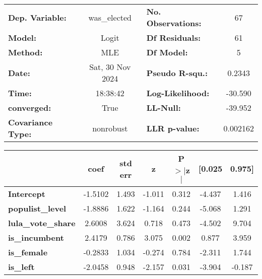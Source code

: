 \begin{center}
\begin{tabular}{lclc}
\toprule
\textbf{Dep. Variable:}    &   was\_elected   & \textbf{  No. Observations:  } &       67    \\
\textbf{Model:}            &      Logit       & \textbf{  Df Residuals:      } &       61    \\
\textbf{Method:}           &       MLE        & \textbf{  Df Model:          } &        5    \\
\textbf{Date:}             & Sat, 30 Nov 2024 & \textbf{  Pseudo R-squ.:     } &   0.2343    \\
\textbf{Time:}             &     18:38:42     & \textbf{  Log-Likelihood:    } &   -30.590   \\
\textbf{converged:}        &       True       & \textbf{  LL-Null:           } &   -39.952   \\
\textbf{Covariance Type:}  &    nonrobust     & \textbf{  LLR p-value:       } &  0.002162   \\
\bottomrule
\end{tabular}
\begin{tabular}{lcccccc}
                           & \textbf{coef} & \textbf{std err} & \textbf{z} & \textbf{P$> |$z$|$} & \textbf{[0.025} & \textbf{0.975]}  \\
\midrule
\textbf{Intercept}         &      -1.5102  &        1.493     &    -1.011  &         0.312        &       -4.437    &        1.416     \\
\textbf{populist\_level}   &      -1.8886  &        1.622     &    -1.164  &         0.244        &       -5.068    &        1.291     \\
\textbf{lula\_vote\_share} &       2.6008  &        3.624     &     0.718  &         0.473        &       -4.502    &        9.704     \\
\textbf{is\_incumbent}     &       2.4179  &        0.786     &     3.075  &         0.002        &        0.877    &        3.959     \\
\textbf{is\_female}        &      -0.2833  &        1.034     &    -0.274  &         0.784        &       -2.311    &        1.744     \\
\textbf{is\_left}          &      -2.0458  &        0.948     &    -2.157  &         0.031        &       -3.904    &       -0.187     \\
\bottomrule
\end{tabular}
\end{center}